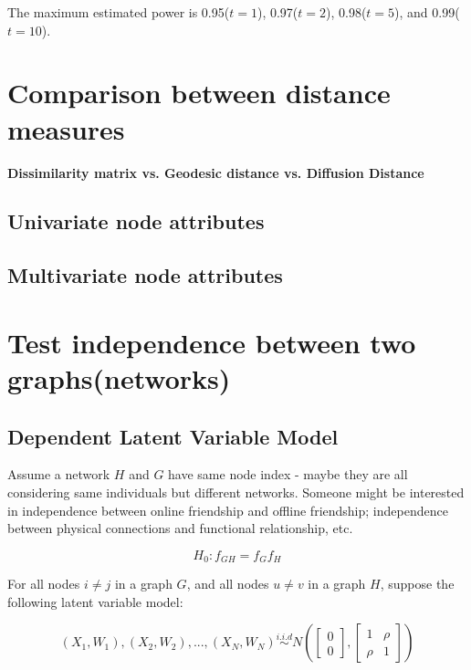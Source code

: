 \documentclass[12pt]{report}
\begin{document}
The maximum estimated power is 0.95($t=1$), 0.97($t=2$), 0.98($t=5$), and 0.99($t=10$).


\newpage
\section{Comparison between distance measures}
\textbf{Dissimilarity matrix vs. Geodesic distance vs. Diffusion Distance}


\subsection{Univariate node attributes}





\subsection{Multivariate node attributes}



\newpage
\section{Test independence between two graphs(networks)}

\subsection{Dependent Latent Variable Model}

Assume a network $H$ and $G$ have same node index - maybe they are all considering same individuals but different networks. Someone might be interested in independence between online friendship and offline friendship; independence between physical connections and functional relationship, etc. 

$$H_{0}: f_{GH}  = f_{G} f_{H}$$

For all nodes $i \neq j$ in a graph $G$, and all nodes $u \neq v$ in a graph $H$, suppose the following latent variable model:

\begin{equation} 
\label{eq:latent}
(X_1, W_1), (X_2, W_2) , ... , (X_N, W_N)  \overset{i.i.d}{\sim} N \left( \begin{bmatrix} 0 \\ 0 \end{bmatrix}, \begin{bmatrix}1 & \rho \\ \rho & 1 \end{bmatrix}  \right)
\end{equation}
\end{document}
